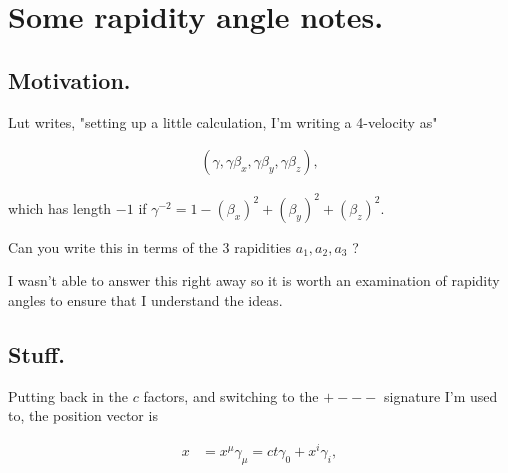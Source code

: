 
%
%




\chapter{Some rapidity angle notes. }
\label{chap:rapidity}
\date{ Dec 18, 2008.  rapidity.tex }

%


\section{Motivation. }

Lut writes, "setting up a little calculation, I'm writing a 4-velocity as"
 
\begin{align*}
( \gamma, \gamma \beta_x, \gamma \beta_y, \gamma \beta_z ),
\end{align*}
 
which has length $-1$ if $\gamma^{-2} = 1 - (\beta_x)^2+(\beta_y)^2+(\beta_z)^2$.
 
Can you write this in terms of the 3 rapidities $a_1, a_2, a_3$ ?

I wasn't able to answer this right away so it is worth an examination
of rapidity angles to ensure that I understand the ideas.

\section{Stuff. }

Putting back in the $c$ factors, and switching to the $+---$ signature I'm used to, the position
vector is

\begin{align*}
x &= x^\mu \gamma_\mu = ct \gamma_0 + x^i \gamma_i,
\end{align*}

